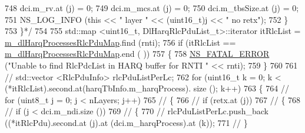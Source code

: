 \begin{DoxyCode}
{748 \textcolor{comment}{                                        dci.m\_rv.at (j) = 0;}
749 \textcolor{comment}{                                        dci.m\_mcs.at (j) = 0;}
750 \textcolor{comment}{                                        dci.m\_tbsSize.at (j) = 0;}
751 \textcolor{comment}{                                        NS\_LOG\_INFO (this << " layer " << (uint16\_t)j << " no retx");}
752 \textcolor{comment}{                                \}}
753 \textcolor{comment}{                        \}*/}
754 
755                                 std::map <uint16\_t, DlHarqRlcPduList\_t>::iterator itRlcList =  
      \hyperlink{classns3_1_1MmWaveRrMacScheduler_a51e5c8d3c34be4e070f2fb3e621cd418}{m\_dlHarqProcessesRlcPduMap}.find (rnti);
756                                 \textcolor{keywordflow}{if} (itRlcList == \hyperlink{classns3_1_1MmWaveRrMacScheduler_a51e5c8d3c34be4e070f2fb3e621cd418}{m\_dlHarqProcessesRlcPduMap}.end (
      ))
757                                 \{
758                                         \hyperlink{group__fatal_ga5131d5e3f75d7d4cbfd706ac456fdc85}{NS\_FATAL\_ERROR} (\textcolor{stringliteral}{"Unable to find RlcPdcList in HARQ
       buffer for RNTI "} << rnti);
759                                 \}
760 
761 \textcolor{comment}{//                              std::vector <RlcPduInfo> rlcPduListPerLc;}
762                                 \textcolor{keywordflow}{for} (uint16\_t k = 0; k < (*itRlcList).second.at(harqTbInfo.m\_harqProcess).
      size (); k++)
763                                 \{
764                                         \textcolor{comment}{//                                      for (uint8\_t j = 0; j <
       nLayers; j++)}
765                                         \textcolor{comment}{//                                      \{}
766                                         \textcolor{comment}{//                                              if (retx.at (j))}
767                                         \textcolor{comment}{//                                              \{}
768                                         \textcolor{comment}{//                                                      if (j <
       dci.m\_ndi.size ())}
769                                         \textcolor{comment}{//                                                      \{}
770                                         \textcolor{comment}{//                                                              
      rlcPduListPerLc.push\_back ((*itRlcPdu).second.at (j).at (dci.m\_harqProcess).at (k));}
771                                         \textcolor{comment}{//                                                      \}}
}
\end{DoxyCode}
